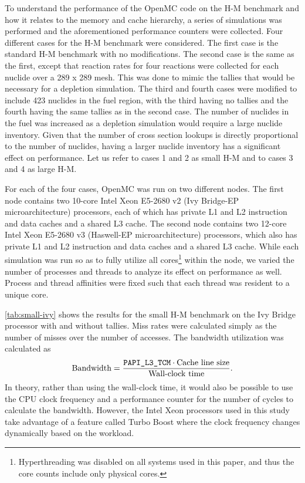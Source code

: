 \documentclass{mc2015}
\begin{document}
To understand the performance of the OpenMC code on the H-M benchmark and how
it relates to the memory and cache hierarchy, a series of simulations was
performed and the aforementioned performance counters were collected. Four
different cases for the H-M benchmark were considered. The first case is the
standard H-M benchmark with no modifications. The second case is the same as
the first, except that reaction rates for four reactions were collected for
each nuclide over a 289 x 289 mesh. This was done to mimic the tallies that
would be necessary for a depletion simulation. The third and fourth cases were
modified to include 423 nuclides in the fuel region, with the third having no
tallies and the fourth having the same tallies as in the second case. The
number of nuclides in the fuel was increased as a depletion simulation would
require a large nuclide inventory. Given that the number of cross section
lookups is directly proportional to the number of nuclides, having a larger
nuclide inventory has a significant effect on performance. Let us refer to
cases 1 and 2 as small H-M and to cases 3 and 4 as large H-M.

For each of the four cases, OpenMC was run on two different nodes. The first
node contains two 10-core Intel Xeon E5-2680 v2 (Ivy Bridge-EP
microarchitecture) processors, each of which has private L1 and L2 instruction
and data caches and a shared L3 cache. The second node contains two 12-core
Intel Xeon E5-2680 v3 (Haswell-EP microarchitecture) processors, which also has
private L1 and L2 instruction and data caches and a shared L3 cache. While each
simulation was run so as to fully utilize all cores\footnote{Hyperthreading was
  disabled on all systems used in this paper, and thus the core counts include
  only physical cores.} within the node, we varied the number of processes and
threads to analyze its effect on performance as well. Process and thread
affinities were fixed such that each thread was resident to a unique core.

\autoref{tab:small-ivy} shows the results for the small H-M benchmark on the
Ivy Bridge processor with and without tallies. Miss rates were calculated
simply as the number of misses over the number of accesses. The bandwidth
utilization was calculated as~\cite{physor-tramm-2014}
\begin{equation}
  \label{eq:bandwidth}
  \text{Bandwidth} = \frac{\text{\texttt{PAPI\_L3\_TCM}}\cdot\text{Cache line
      size}}{\text{Wall-clock time}}.
\end{equation}
In theory, rather than using the wall-clock time, it would also be possible to
use the CPU clock frequency and a performance counter for the number of cycles
to calculate the bandwidth. However, the Intel Xeon processors used in this
study take advantage of a feature called Turbo Boost where the clock frequency
changes dynamically based on the workload.
\end{document}
